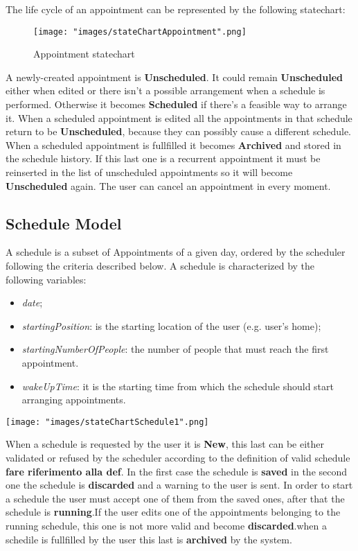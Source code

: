 The life cycle of an appointment can be represented by the following statechart:
\begin{figure}[H]
\begin{center}
\texttt{[image: "images/stateChartAppointment".png]}
\caption{Appointment statechart}
\label{fig:stchartApp}
\end{center}
\end{figure}

A newly-created appointment is \textbf{Unscheduled}. It could remain \textbf{Unscheduled} either when edited or there isn't a possible arrangement when a schedule is performed. Otherwise it becomes \textbf{Scheduled} if there's a feasible way to arrange it. When a scheduled appointment is edited all the appointments in that schedule return to be \textbf{Unscheduled}, because they can possibly cause a different schedule. When a scheduled appointment is fullfilled it becomes \textbf{Archived} and stored in the schedule history. If this last one is a recurrent appointment it must be reinserted in the list of unscheduled appointments so it will become \textbf{Unscheduled} again. The user can cancel an appointment in every moment. 

\subsection{Schedule Model} \label{subsect:schmodel}
A schedule is a subset of Appointments of a  given day, ordered by the scheduler following the criteria described below.
A schedule is characterized by the following variables:
\begin{itemize}
\item \textit{date};
\item \textit{startingPosition}: is the starting location of the user (e.g. user's home);
\item \textit{startingNumberOfPeople}: the number of people that must reach the first appointment.
\item \textit{wakeUpTime}: it is the starting time from which the schedule should start arranging appointments.
\end{itemize}

\texttt{[image: "images/stateChartSchedule1".png]}

When a schedule is requested by the user it is \textbf{New}, this last can be either validated or refused by the scheduler according to the definition of valid schedule \textbf{fare riferimento alla def}.
In the first case the schedule is \textbf{saved} in the second one the schedule is \textbf{discarded} and a warning to the user is sent. In order to start a schedule the user must accept one of them from the saved ones, after that the schedule is \textbf{running}.If the user edits one of the appointments belonging to the running schedule, this one is not more valid and become \textbf{discarded}.when a schedile is fullfilled by the user this last is \textbf{archived} by the system.

